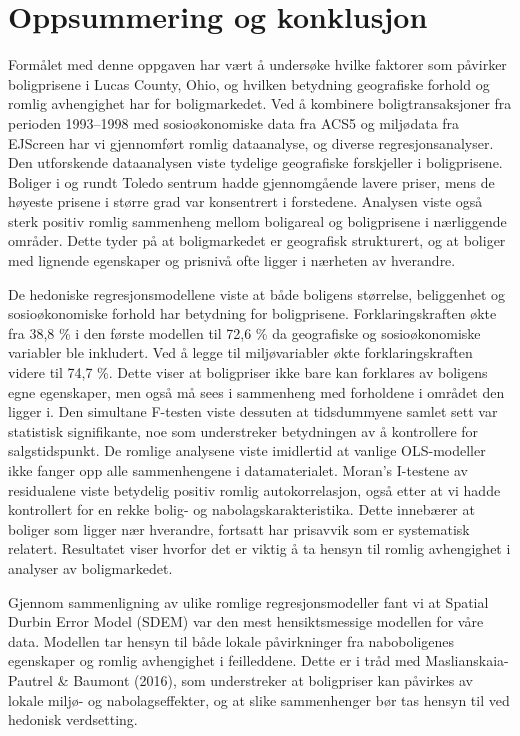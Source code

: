 \documentclass[
  norsk,
  a4paper,
]{article}
\begin{document}
\section{Oppsummering og konklusjon}\label{oppsummering-og-konklusjon}

Formålet med denne oppgaven har vært å undersøke hvilke faktorer som
påvirker boligprisene i Lucas County, Ohio, og hvilken betydning
geografiske forhold og romlig avhengighet har for boligmarkedet. Ved å
kombinere boligtransaksjoner fra perioden 1993--1998 med sosioøkonomiske
data fra ACS5 og miljødata fra EJScreen har vi gjennomført romlig
dataanalyse, og diverse regresjonsanalyser. Den utforskende dataanalysen
viste tydelige geografiske forskjeller i boligprisene. Boliger i og
rundt Toledo sentrum hadde gjennomgående lavere priser, mens de høyeste
prisene i større grad var konsentrert i forstedene. Analysen viste også
sterk positiv romlig sammenheng mellom boligareal og boligprisene i
nærliggende områder. Dette tyder på at boligmarkedet er geografisk
strukturert, og at boliger med lignende egenskaper og prisnivå ofte
ligger i nærheten av hverandre.

De hedoniske regresjonsmodellene viste at både boligens størrelse,
beliggenhet og sosioøkonomiske forhold har betydning for boligprisene.
Forklaringskraften økte fra 38,8 \% i den første modellen til 72,6 \% da
geografiske og sosioøkonomiske variabler ble inkludert. Ved å legge til
miljøvariabler økte forklaringskraften videre til 74,7 \%. Dette viser
at boligpriser ikke bare kan forklares av boligens egne egenskaper, men
også må sees i sammenheng med forholdene i området den ligger i. Den
simultane F-testen viste dessuten at tidsdummyene samlet sett var
statistisk signifikante, noe som understreker betydningen av å
kontrollere for salgstidspunkt. De romlige analysene viste imidlertid at
vanlige OLS-modeller ikke fanger opp alle sammenhengene i
datamaterialet. Moran's I-testene av residualene viste betydelig positiv
romlig autokorrelasjon, også etter at vi hadde kontrollert for en rekke
bolig- og nabolagskarakteristika. Dette innebærer at boliger som ligger
nær hverandre, fortsatt har prisavvik som er systematisk relatert.
Resultatet viser hvorfor det er viktig å ta hensyn til romlig
avhengighet i analyser av boligmarkedet.

Gjennom sammenligning av ulike romlige regresjonsmodeller fant vi at
Spatial Durbin Error Model (SDEM) var den mest hensiktsmessige modellen
for våre data. Modellen tar hensyn til både lokale påvirkninger fra
naboboligenes egenskaper og romlig avhengighet i feilleddene. Dette er i
tråd med Maslianskaia-Pautrel \& Baumont (2016), som understreker at
boligpriser kan påvirkes av lokale miljø- og nabolagseffekter, og at
slike sammenhenger bør tas hensyn til ved hedonisk verdsetting.
\end{document}
